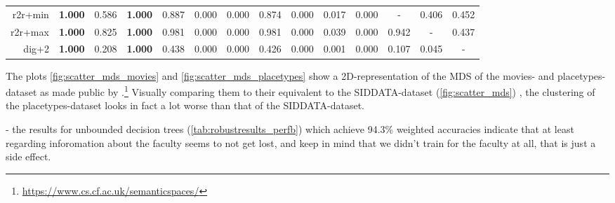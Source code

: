 \begin{table}[H]
{\begin{tabular}{rccccccccccccc}
		r2r+min  & \bfseries 1.000 & 0.586 & \bfseries 1.000 & 0.887 & 0.000 & 0.000 & 0.874 & 0.000 & 0.017 & 0.000 & - & 0.406 & 0.452 \\
		r2r+max  & \bfseries 1.000 & 0.825 & \bfseries 1.000 & 0.981 & 0.000 & 0.000 & 0.981 & 0.000 & 0.039 & 0.000 & 0.942 & - & 0.437 \\
		dig+2  & \bfseries 1.000 & 0.208 & \bfseries 1.000 & 0.438 & 0.000 & 0.000 & 0.426 & 0.000 & 0.001 & 0.000 & 0.107 & 0.045 & - \\
		\bottomrule
	\end{tabular}
		}
\end{table}
	
	
	












The plots \ref{fig:scatter_mds_movies} and \ref{fig:scatter_mds_placetypes} show a 2D-representation of the MDS %
of the movies- and placetypes-dataset as made public by \textcite{Derrac2015}.\footnote{\url{https://www.cs.cf.ac.uk/semanticspaces/}} Visually comparing them to their equivalent to the SIDDATA-dataset (\autoref{fig:scatter_mds}) , the clustering of the placetypes-dataset looks in fact a lot worse than that of the SIDDATA-dataset.








 - the results for unbounded decision trees (\autoref{tab:robustresults_perfb}) which achieve 94.3\% weighted accuracies indicate that at least regarding inforomation about the faculty seems to not get lost, and keep in mind that we didn't train for the faculty at all, that is just a side effect.


